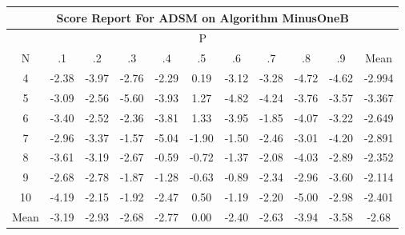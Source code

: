 \documentclass[11pt,a4paper]{report}
\begin{document}
\begin{longtable}{ | c || c | c | c | c | c | c | c | c | c || c |}
\hline
\multicolumn{11}{|c|}{ Score Report For ADSM on Algorithm MinusOneB} \\
\hline
\multicolumn{11}{|c|}{ P } \\
\hline
N & .1 & .2 & .3 & .4 & .5 & .6 & .7 & .8 & .9 & Mean\\
 \hline
 \hline
 \endhead
  4 &  \cellcolor[HTML]{FFBFBF} -2.38 &  \cellcolor[HTML]{FF9F9F} -3.97 &  \cellcolor[HTML]{FFB7B7} -2.76 &  \cellcolor[HTML]{FFC7C7} -2.29 &  \cellcolor[HTML]{F7F7FF} 0.19 &  \cellcolor[HTML]{FFAFAF} -3.12 &  \cellcolor[HTML]{FFAFAF} -3.28 &  \cellcolor[HTML]{FF8787} -4.72 &  \cellcolor[HTML]{FF8787} -4.62 & -2.994 \\
  5 &  \cellcolor[HTML]{FFAFAF} -3.09 &  \cellcolor[HTML]{FFBFBF} -2.56 &  \cellcolor[HTML]{FF7070} -5.60 &  \cellcolor[HTML]{FF9F9F} -3.93 &  \cellcolor[HTML]{DFDFFF} 1.27 &  \cellcolor[HTML]{FF8787} -4.82 &  \cellcolor[HTML]{FF9797} -4.24 &  \cellcolor[HTML]{FF9F9F} -3.76 &  \cellcolor[HTML]{FFA7A7} -3.57 & -3.367 \\
  6 &  \cellcolor[HTML]{FFA7A7} -3.40 &  \cellcolor[HTML]{FFBFBF} -2.52 &  \cellcolor[HTML]{FFC7C7} -2.36 &  \cellcolor[HTML]{FF9F9F} -3.81 &  \cellcolor[HTML]{DFDFFF} 1.33 &  \cellcolor[HTML]{FF9F9F} -3.95 &  \cellcolor[HTML]{FFCFCF} -1.85 &  \cellcolor[HTML]{FF9797} -4.07 &  \cellcolor[HTML]{FFAFAF} -3.22 & -2.649 \\
  7 &  \cellcolor[HTML]{FFB7B7} -2.96 &  \cellcolor[HTML]{FFA7A7} -3.37 &  \cellcolor[HTML]{FFD7D7} -1.57 &  \cellcolor[HTML]{FF8080} -5.04 &  \cellcolor[HTML]{FFCFCF} -1.90 &  \cellcolor[HTML]{FFD7D7} -1.50 &  \cellcolor[HTML]{FFBFBF} -2.46 &  \cellcolor[HTML]{FFB7B7} -3.01 &  \cellcolor[HTML]{FF9797} -4.20 & -2.891 \\
  8 &  \cellcolor[HTML]{FFA7A7} -3.61 &  \cellcolor[HTML]{FFAFAF} -3.19 &  \cellcolor[HTML]{FFBFBF} -2.67 &  \cellcolor[HTML]{FFEFEF} -0.59 &  \cellcolor[HTML]{FFEFEF} -0.72 &  \cellcolor[HTML]{FFDFDF} -1.37 &  \cellcolor[HTML]{FFC7C7} -2.08 &  \cellcolor[HTML]{FF9797} -4.03 &  \cellcolor[HTML]{FFB7B7} -2.89 & -2.352 \\
  9 &  \cellcolor[HTML]{FFBFBF} -2.68 &  \cellcolor[HTML]{FFB7B7} -2.78 &  \cellcolor[HTML]{FFCFCF} -1.87 &  \cellcolor[HTML]{FFDFDF} -1.28 &  \cellcolor[HTML]{FFEFEF} -0.63 &  \cellcolor[HTML]{FFE7E7} -0.89 &  \cellcolor[HTML]{FFC7C7} -2.34 &  \cellcolor[HTML]{FFB7B7} -2.96 &  \cellcolor[HTML]{FFA7A7} -3.60 & -2.114 \\
  10 &  \cellcolor[HTML]{FF9797} -4.19 &  \cellcolor[HTML]{FFC7C7} -2.15 &  \cellcolor[HTML]{FFCFCF} -1.92 &  \cellcolor[HTML]{FFBFBF} -2.47 &  \cellcolor[HTML]{EFEFFF} 0.50 &  \cellcolor[HTML]{FFDFDF} -1.19 &  \cellcolor[HTML]{FFC7C7} -2.20 &  \cellcolor[HTML]{FF8080} -5.00 &  \cellcolor[HTML]{FFB7B7} -2.98 & -2.401 \\
 \hline
 \hline
Mean &  \cellcolor[HTML]{FFAFAF} -3.19 &  \cellcolor[HTML]{FFB7B7} -2.93 &  \cellcolor[HTML]{FFBFBF} -2.68 &  \cellcolor[HTML]{FFB7B7} -2.77 &  \cellcolor[HTML]{FFFFFF} 0.00 &  \cellcolor[HTML]{FFBFBF} -2.40 &  \cellcolor[HTML]{FFBFBF} -2.63 &  \cellcolor[HTML]{FF9F9F} -3.94 &  \cellcolor[HTML]{FFA7A7} -3.58 &  \cellcolor[HTML]{FFBFBF} -2.68
\end{longtable}
\end{document}

